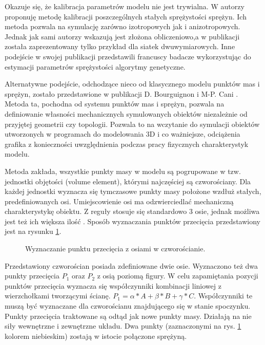 Okazuje się, że kalibracja parametrów modelu nie jest trywialna. W \cite{usa} autorzy proponuję metodę kalibracji poszczególnych stałych sprężystości sprężyn. Ich metoda pozwala na symulację zarówno izotropowych jak i anizotropowych. Jednak jak sami autorzy wskazują jest złożona obliczeniowo,a w publikacji została zaprezentowany tylko przykład dla siatek dwuwymiarowych. Inne podejście w swojej publikacji przedstawili francuscy badacze wykorzystując do estymacji parametrów sprężystości algorytmy genetyczne.\cite{ei}

Alternatywne podejście, odchodzące nieco od klasycznego modelu punktów mas i sprężyn, zostało przedstawione w publikacji D. Bourguignon i M-P. Cani \cite{ca}. Metoda ta, pochodna od systemu punktów mas i sprężyn, pozwala na definiowanie własności mechanicznych symulowanych obiektów niezależnie od przyjętej geometrii czy topologii. Pozwala to na wczytanie do symulacji obiektów utworzonych w programach do modelowania 3D i co ważniejsze, odciążenia grafika z konieczności uwzględnienia podczas pracy fizycznych charakterystyk modelu.\cite{ca}

Metoda zakłada, wszystkie punkty masy w modelu są pogrupowane w tzw. jednostki objętości (volume element), którymi najczęściej są czworościany. Dla każdej jednostki wyznacza się tymczasowe punkty masy położone wzdłuż stałych, predefiniowanych osi. Umiejscowienie osi ma odzwierciedlać mechaniczną charakterystykę obiektu. Z reguły stosuje się standardowo 3 osie, jednak możliwa jest też ich większa ilość \cite{ca}. Sposób wyznaczania punktów przecięcia przedstawiony jest na rysunku \ref{anizotropia-czworoscian}.

\begin{figure}[ht]
\centering

\caption{Wyznaczanie punktu przecięcia z osiami w czworościanie.}
\label{anizotropia-czworoscian}
\end{figure}

Przedstawiony czworościan posiada zdefiniowane dwie osie. Wyznaczono też dwa punkty przecięcia $P_1$ oraz $P_2$ z osią poziomą figury. W celu zapamiętania pozycji punktów przecięcia wyznacza się współczynniki kombinacji liniowej z wierzchołkami tworzącymi ścianę. $P_1 = \alpha * A + \beta *B + \gamma *C$. Współczynniki te muszą być wyznaczane dla czworościanu znajdującego się w stanie spoczynku. Punkty przecięcia traktowane są odtąd jak nowe punkty masy. Działają na nie siły wewnętrzne i zewnętrzne układu. Dwa punkty (zaznaczonymi na rys. \ref{anizotropia-czworoscian} kolorem niebieskim) zostają w istocie połączone sprężyną.

